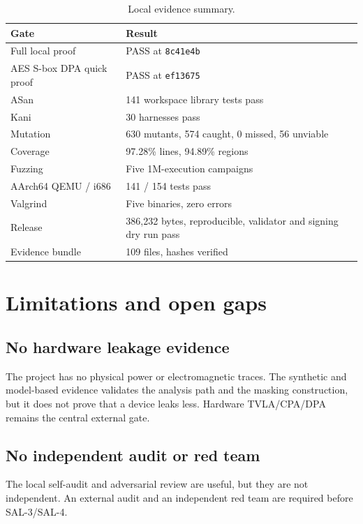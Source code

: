 \documentclass[11pt,a4paper]{article}
\newcommand{\code}[1]{\texttt{#1}}
\theoremstyle{plain}
\theoremstyle{definition}
\theoremstyle{remark}
\begin{document}
\begin{table}[htbp]
\centering
\caption{Local evidence summary.}
\label{tab:evidence}
\begin{tabularx}{\linewidth}{@{}lX@{}}
\toprule
Gate & Result \\
\midrule
Full local proof & PASS at \code{8c41e4b} \\
AES S-box DPA quick proof & PASS at \code{ef13675} \\
ASan & 141 workspace library tests pass \\
Kani & 30 harnesses pass \\
Mutation & 630 mutants, 574 caught, 0 missed, 56 unviable \\
Coverage & 97.28\% lines, 94.89\% regions \\
Fuzzing & Five 1M-execution campaigns \\
AArch64 QEMU / i686 & 141 / 154 tests pass \\
Valgrind & Five binaries, zero errors \\
Release & 386{,}232 bytes, reproducible, validator and signing dry run pass \\
Evidence bundle & 109 files, hashes verified \\
\bottomrule
\end{tabularx}
\end{table}

\section{Limitations and open gaps}\label{sec:limitations}

\subsection{No hardware leakage evidence}

The project has no physical power or electromagnetic traces. The synthetic and
model-based evidence validates the analysis path and the masking construction, but it
does not prove that a device leaks less. Hardware TVLA/CPA/DPA remains the central
external gate.

\subsection{No independent audit or red team}

The local self-audit and adversarial review are useful, but they are not independent.
An external audit and an independent red team are required before SAL-3/SAL-4.
\end{document}
